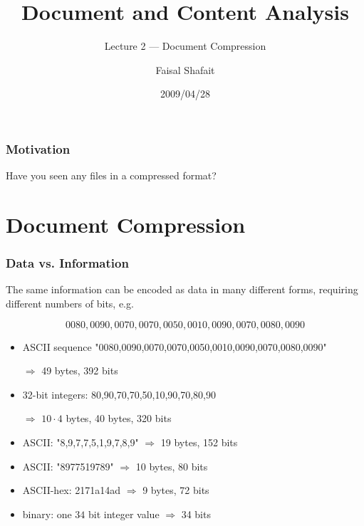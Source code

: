 \documentclass{beamer}
\title[DCA-SS09 Lecture-2]%
{Document and Content Analysis}
\subtitle{Lecture 2 --- Document Compression}
\author[Shafait]{Faisal Shafait}
\institute[TU-KL - IUPR - DFKI] %
{
Image Understanding and Pattern Recognition\\
DFKI \& TU Kaiserslautern\\
}
\date[2009/04/28]{2009/04/28}
\begin{document}
\begin{frame}
  \titlepage
\end{frame}

\begin{frame}
  \frametitle{Motivation}
  Have you seen any files in a compressed format?
\\[6pt]

\end{frame}






\section{Document Compression}

\begin{frame}
\frametitle{Data vs. Information}
The same information can be encoded as data in many different forms,
requiring different numbers of bits, e.g.

$$0080,0090,0070,0070,0050,0010,0090,0070,0080,0090$$

\begin{itemize}
\item ASCII sequence "0080,0090,0070,0070,0050,0010,0090,0070,0080,0090"

\qquad $\Rightarrow$ 49 bytes, 392 bits

\item 32-bit integers: 80,90,70,70,50,10,90,70,80,90

\qquad $\Rightarrow$ $10\cdot 4$ bytes, 40 bytes, 320 bits

\item ASCII: "8,9,7,7,5,1,9,7,8,9" \quad $\Rightarrow$ 19 bytes, 152 bits

\item ASCII: "8977519789" \quad $\Rightarrow$ 10 bytes, 80 bits

\item ASCII-hex: 2171a14ad \quad $\Rightarrow$ 9 bytes, 72 bits

\item binary: one $34$ bit integer value \quad $\Rightarrow$ 34 bits

\end{itemize}
\end{frame}
\end{document}
